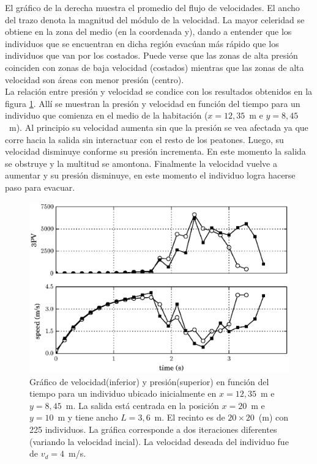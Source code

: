 El gráfico de la derecha muestra el promedio del flujo de velocidades. El ancho del trazo denota la magnitud del módulo de la velocidad. La mayor celeridad se obtiene en la zona del medio (en la coordenada y), dando a entender que los individuos que se encuentran en dicha región evacúan más rápido que los individuos que van por los costados. 
Puede verse que las zonas de alta presión coinciden con zonas de baja velocidad (costados) mientras que las zonas de alta velocidad son áreas con menor presión (centro). \\

La relación entre presión y velocidad se condice con los resultados obtenidos en la figura \ref{pv_vel_t_100_3_6}. Allí se muestran la presión y velocidad en función del tiempo para un individuo que comienza en el medio de la habitación ($x=12,35$~m e $y=8,45$~m). Al principio su velocidad aumenta sin que la presión se vea afectada ya que corre hacia la salida sin interactuar con el resto de los peatones. Luego, su velocidad disminuye conforme su presión incrementa. En este momento la salida se obstruye y la multitud se amontona. Finalmente la velocidad vuelve a aumentar y su presión disminuye, en este momento el individuo logra hacerse paso para evacuar. 

\begin{figure}[H]
    \centering
    \includegraphics[scale=0.8]{figuras/pv_vel_t_100_3_6.eps}
    \caption[width=5cm]{Gráfico de velocidad(inferior) y presión(superior) en función del tiempo para un individuo ubicado inicialmente en $x=12,35$~m e $y=8,45$~m.  La salida está centrada en la posición $x=20$~m e $y=10$~m y tiene ancho $L=3,6$~m. El recinto es de $20\times 20$~(m) con 225 individuos. La gráfica corresponde a dos iteraciones diferentes (variando la velocidad incial). La velocidad deseada del individuo fue de $v_d=4$~m/s.}
    \label{pv_vel_t_100_3_6}
\end{figure}

